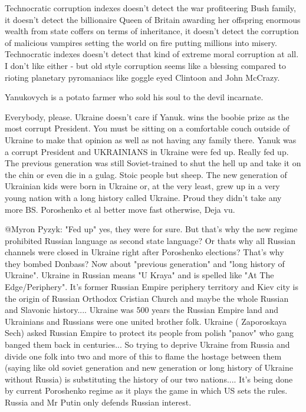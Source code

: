 \begin{itemize}
\begin{itemize}

Technocratic corruption indexes doesn't detect the war profiteering Bush
family, it doesn't detect the billionaire Queen of Britain awarding her
offspring enormous wealth from state coffers on terms of inheritance, it
doesn't detect the corruption of malicious vampires setting the world on fire
putting millions into misery. Technocratic indexes doesn't detect that kind of
extreme moral corruption at all. I don't like either - but old style corruption
seems like a blessing compared to rioting planetary pyromaniacs like goggle
eyed Clintoon and John McCrazy.

Yanukovych is a potato farmer who sold his soul to the devil incarnate.


Everybody, please. Ukraine doesn't care if Yanuk. wins the boobie prize as the
most corrupt President. You must be sitting on a comfortable couch outside of
Ukraine to make that opinion as well as not having any family there. Yanuk was
a corrupt President and UKRAINIANS in Ukraine were fed up. Really fed up. The
previous generation was still Soviet-trained to shut the hell up and take it on
the chin or even die in a gulag. Stoic people but sheep. The new generation of
Ukrainian kids were born in Ukraine or, at the very least, grew up in a very
young nation with a long history called Ukraine. Proud they didn't take any
more BS. Poroshenko et al better move fast otherwise, Deja vu.


@Myron Pyzyk: "Fed up" yes, they were for sure. But that's why the new regime
prohibited Russian language as second state language? Or thats why all Russian
channels were closed in Ukraine right after Poroshenko elections? That's why
they bombed Donbass? Now about "previous generation" and "long history of
Ukraine". Ukraine in Russian means "U Kraya" and is spelled like "At The
Edge/Periphery". It's former Russian Empire periphery territory and Kiev city
is the origin of Russian Orthodox Cristian Church and maybe the whole Russian
and Slavonic history.... Ukraine was 500 years the Russian Empire land and
Ukrainians and Russians were one united brother folk. Ukraine ( Zaporoskaya
Sech) asked Russian Empire to protect its people from polish "panov" who gang
banged them back in centuries... So trying to deprive Ukraine from Russia and
divide one folk into two and more of this to flame the hostage between them
(saying like old soviet generation and new generation or long history of
Ukraine without Russia) is substituting the history of our two nations.... It's
being done by current Poroshenko regime as it plays the game in which US sets
the rules. Russia and Mr Putin only defends Russian interest.


\end{itemize}
\end{itemize}
